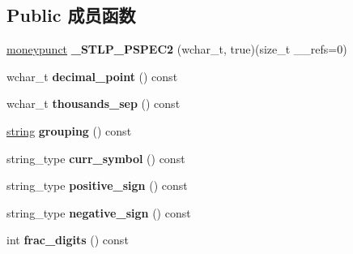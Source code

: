 \subsection*{Public 成员函数}
\begin{DoxyCompactItemize}
\item 
\mbox{\label{classmoneypunct_3_01wchar__t_00_01true_01_4_a464a678180ced3be4979c3864b4c0e19}} 
\hyperlink{classmoneypunct}{moneypunct} {\bfseries \+\_\+\+S\+T\+L\+P\+\_\+\+P\+S\+P\+E\+C2} (wchar\+\_\+t, true)(size\+\_\+t \+\_\+\+\_\+refs=0)
\item 
\mbox{\label{classmoneypunct_3_01wchar__t_00_01true_01_4_a1152ff3d81c451bd1f605ce841fc5154}} 
wchar\+\_\+t {\bfseries decimal\+\_\+point} () const
\item 
\mbox{\label{classmoneypunct_3_01wchar__t_00_01true_01_4_a30dc29fcea81b07d1a5ab841b0e4134c}} 
wchar\+\_\+t {\bfseries thousands\+\_\+sep} () const
\item 
\mbox{\label{classmoneypunct_3_01wchar__t_00_01true_01_4_ae8281c729b354fe6404d7601c4a57fd4}} 
\hyperlink{structstring}{string} {\bfseries grouping} () const
\item 
\mbox{\label{classmoneypunct_3_01wchar__t_00_01true_01_4_a422c5ac2ba3de954c2bf1ca5f79cb1be}} 
string\+\_\+type {\bfseries curr\+\_\+symbol} () const
\item 
\mbox{\label{classmoneypunct_3_01wchar__t_00_01true_01_4_a888be198f1e4ebedf9ab273dcd15354c}} 
string\+\_\+type {\bfseries positive\+\_\+sign} () const
\item 
\mbox{\label{classmoneypunct_3_01wchar__t_00_01true_01_4_a505204a1327eb30c4806f36695bed697}} 
string\+\_\+type {\bfseries negative\+\_\+sign} () const
\item 
\mbox{\label{classmoneypunct_3_01wchar__t_00_01true_01_4_a8d6d70d874758247b6d523207fa416ab}} 
int {\bfseries frac\+\_\+digits} () const

\end{DoxyCompactItemize}
